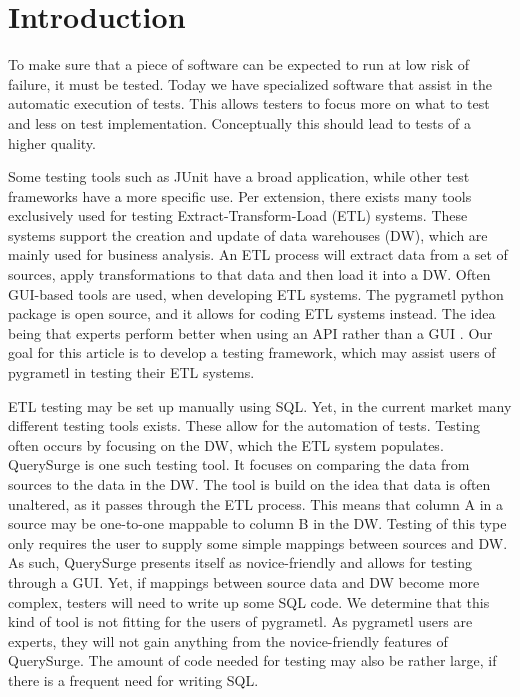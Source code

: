 \section{Introduction}\label{intro} %
To make sure that a piece of software can be expected to run at low risk of failure, it must be tested. Today we have specialized software that assist in the automatic execution of tests. This allows testers to focus more on what to test and less on test implementation. Conceptually this should lead to tests of a higher quality.

Some testing tools such as JUnit have a broad application, while other test frameworks have a more specific use. Per extension, there exists many tools exclusively used for testing Extract-Transform-Load (ETL) systems. These systems support the creation and update of data warehouses (DW), which are mainly used for business analysis. An ETL process will extract data from a set of sources, apply transformations to that data and then load it into a DW. Often GUI-based tools are used, when developing ETL systems. The pygrametl python package is open source, and it allows for coding ETL systems instead. The idea being that experts perform better when using an API rather than a GUI \cite{thomsen2009pygrametl}. Our goal for this article is to develop a testing framework, which may assist users of pygrametl in testing their ETL systems.

ETL testing may be set up manually using SQL. Yet, in the current market many different testing tools exists. These allow for the automation of tests. Testing often occurs by focusing on the DW, which the ETL system populates. QuerySurge\cite{QuerySurge} is one such testing tool. It focuses on comparing the data from sources to the data in the DW. The tool is build on the idea that data is often unaltered, as it passes through the ETL process. This means that column A in a source may be one-to-one mappable to column B in the DW. Testing of this type only requires the user to supply some simple mappings between sources and DW. As such, QuerySurge presents itself as novice-friendly and allows for testing through a GUI. Yet, if mappings between source data and DW become more complex, testers will need to write up some SQL code. We determine that this kind of tool is not fitting for the users of pygrametl. As pygrametl users are experts, they will not gain anything from the novice-friendly features of QuerySurge. The amount of code needed for testing may also be rather large, if there is a frequent need for writing SQL.

